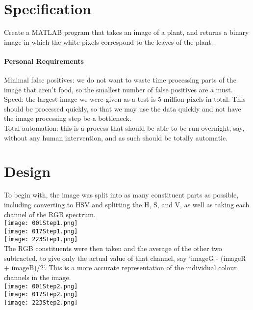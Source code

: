 \documentclass[12pt]{article}
\begin{document}
\maketitle

\section{Specification}
Create a MATLAB program that takes an image of a plant, and returns a binary image in which
the white pixels correspond to the leaves of the plant.

\paragraph{Personal Requirements}
Minimal false positives: we do not want to waste time processing parts of the image that aren't
food, so the smallest number of false positives are a must.\\
Speed: the largest image we were given as a test is 5 million pixels in total. This should be
processed quickly, so that we may use the data quickly and not have the image processing step be
a bottleneck.\\
Total automation: this is a process that should be able to be run overnight, say, without any human
intervention, and as such should be totally automatic.

\section{Design}
To begin with, the image was split into as many constituent parts as possible, including converting
to HSV and splitting the H, S, and V, as well as taking each channel of the RGB spectrum.\\
\texttt{[image: 001Step1.png]}\\
\texttt{[image: 017Step1.png]}\\
\texttt{[image: 223Step1.png]}\\

The RGB constituents were then taken and the average of the other two subtracted, to give only the actual
value of that channel, say `imageG - (imageR + imageB)/2`. This is a more accurate representation of
the individual colour channels in the image.\\
\texttt{[image: 001Step2.png]}\\
\texttt{[image: 017Step2.png]}\\
\texttt{[image: 223Step2.png]}\\
\end{document}
